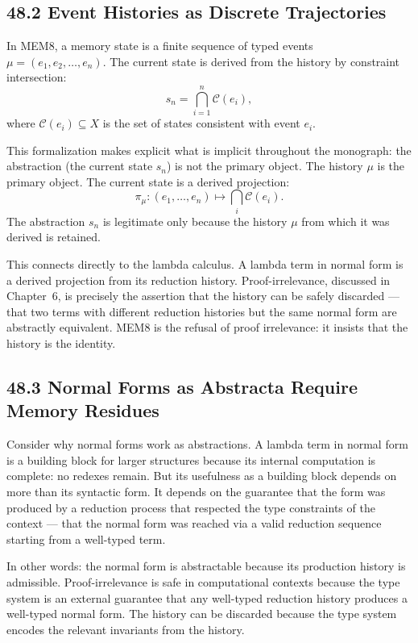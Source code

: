 \documentclass[12pt,letterpaper]{article}
\theoremstyle{remark}
\begin{document}
\subsection{48.2 Event Histories as Discrete Trajectories}

In MEM\textbar{}8, a memory state is a finite sequence of typed
events $\mu = (e_1, e_2, \ldots, e_n)$. The current state is
derived from the history by constraint intersection:
\[
s_n = \bigcap_{i=1}^n \mathcal{C}(e_i),
\]
where $\mathcal{C}(e_i) \subseteq X$ is the set of states
consistent with event $e_i$.

This formalization makes explicit what is implicit throughout the
monograph: the abstraction (the current state $s_n$) is not the
primary object. The history $\mu$ is the primary object. The
current state is a derived projection:
\[
\pi_\mu: (e_1, \ldots, e_n) \mapsto \bigcap_i \mathcal{C}(e_i).
\]
The abstraction $s_n$ is legitimate only because the history
$\mu$ from which it was derived is retained.

This connects directly to the lambda calculus. A lambda term in
normal form is a derived projection from its reduction history.
Proof-irrelevance, discussed in Chapter~6, is precisely the
assertion that the history can be safely discarded — that two
terms with different reduction histories but the same normal form
are abstractly equivalent. MEM\textbar{}8 is the refusal of proof
irrelevance: it insists that the history is the identity.

\subsection{48.3 Normal Forms as Abstracta Require Memory Residues}

Consider why normal forms work as abstractions. A lambda term in
normal form is a building block for larger structures because its
internal computation is complete: no redexes remain. But its
usefulness as a building block depends on more than its syntactic
form. It depends on the guarantee that the form was produced by a
reduction process that respected the type constraints of the context
— that the normal form was reached via a valid reduction sequence
starting from a well-typed term.

In other words: the normal form is abstractable because its
production history is admissible. Proof-irrelevance is safe in
computational contexts because the type system is an external
guarantee that any well-typed reduction history produces a
well-typed normal form. The history can be discarded because the
type system encodes the relevant invariants from the history.
\end{document}
